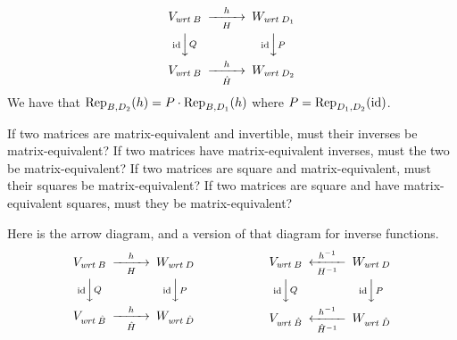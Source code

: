 \begin{exercises}
\begin{answer}
\begin{exparts}
           \begin{equation*}
             \begin{CD}
               V_\wrt{B}                   @>h>H>   W_\wrt{D_1}       \\
               @V\scriptsize\identity VQV      @V\scriptsize\identity VPV \\
               V_\wrt{B}             @>h>\hat{H}>  W_\wrt{D_2}
             \end{CD}
           \end{equation*}
           We have that \( \rep{h}{B,D_2}=P\cdot \rep{h}{B,D_1} \) where
           \( P=\rep{\identity}{D_1,D_2} \).
       \end{exparts}  
      \end{answer}
  \item 
    \begin{exparts}
      \partsitem If two matrices are matrix-equivalent and invertible,
        must their
        inverses be matrix-equivalent?
      \partsitem If two matrices have matrix-equivalent inverses, must the two
        be matrix-equivalent?
      \partsitem If two matrices are square and matrix-equivalent, must their
        squares be matrix-equivalent?
      \partsitem If two matrices are square and have matrix-equivalent squares,
        must they be matrix-equivalent?
    \end{exparts}
    \begin{answer}
      \begin{exparts}
        \partsitem Here is the arrow diagram, and a version of that diagram
          for inverse functions.
          \begin{equation*}
           \begin{CD}
             V_\wrt{B}                   @>h>H>      W_\wrt{D}       \\
             @V\scriptsize\identity VQV       @V\scriptsize\identity VPV \\
             V_\wrt{\hat{B}}             @>h>\hat{H}> W_\wrt{\hat{D}}
            \end{CD}
            \hspace*{4em}\qquad
           \begin{CD}
             V_\wrt{B}              @<h^{-1}<H^{-1}<    W_\wrt{D}       \\
             @V\scriptsize\identity VQV       @V\scriptsize\identity VPV \\
             V_\wrt{\hat{B}}        @<h^{-1}<\hat{H}^{-1}< W_\wrt{\hat{D}}
            \end{CD}

\end{equation*}
\end{exparts}
\end{answer}
\end{exercises}
